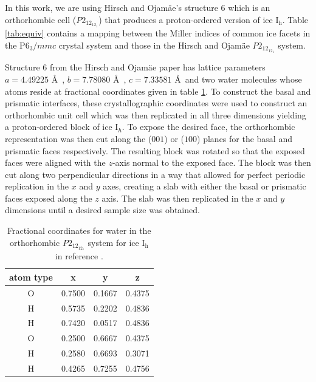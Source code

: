 In this work, we are using Hirsch and Ojam\"{a}e's structure 6 which
is an orthorhombic cell ($P2_12_12_1$) that produces a proton-ordered
version of ice I$_\mathrm{h}$.  Table \ref{tab:equiv} contains a
mapping between the Miller indices of common ice facets in the
P$6_3/mmc$ crystal system and those in the Hirsch and Ojam\"{a}e
$P2_12_12_1$ system.

Structure 6 from the Hirsch and Ojam\"{a}e paper has lattice
parameters $a = 4.49225$ \AA\ , $b = 7.78080$ \AA\ , $c = 7.33581$ \AA\
and two water molecules whose atoms reside at fractional coordinates
given in table \ref{tab:p212121}. To construct the basal and prismatic
interfaces, these crystallographic coordinates were used to construct
an orthorhombic unit cell which was then replicated in all three
dimensions yielding a proton-ordered block of ice I$_{h}$. To expose
the desired face, the orthorhombic representation was then cut along
the ($001$) or ($100$) planes for the basal and prismatic faces
respectively. The resulting block was rotated so that the exposed
faces were aligned with the $z$-axis normal to the exposed face. The
block was then cut along two perpendicular directions in a way that
allowed for perfect periodic replication in the $x$ and $y$ axes,
creating a slab with either the basal or prismatic faces exposed along
the $z$ axis. The slab was then replicated in the $x$ and $y$
dimensions until a desired sample size was obtained.

\begin{table}[h]
\centering
  \caption{Fractional coordinates for water in the orthorhombic
    $P2_12_12_1$ system for ice I$_\mathrm{h}$ in reference  \protect\citep{Hirsch04}.}
\label{tab:p212121}
\begin{tabular}{|cccc|}  \hline
atom type & x & y & z \\ \hline
 O & 0.7500 & 0.1667 & 0.4375 \\
 H & 0.5735 & 0.2202 & 0.4836 \\
 H & 0.7420 & 0.0517 & 0.4836 \\
 O & 0.2500 & 0.6667 & 0.4375 \\
 H & 0.2580 & 0.6693 & 0.3071 \\
 H & 0.4265 & 0.7255 & 0.4756 \\ \hline
\end{tabular}
\end{table}


